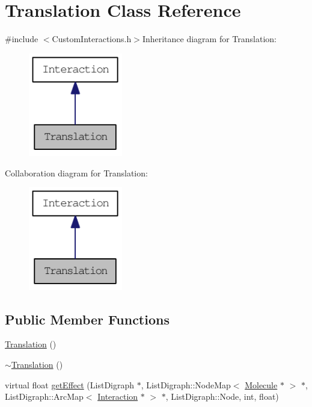 \hypertarget{classTranslation}{
\section{Translation Class Reference}
\label{classTranslation}
}


{\ttfamily \#include $<$CustomInteractions.h$>$}Inheritance diagram for Translation:\nopagebreak
\begin{figure}[H]
\begin{center}
\leavevmode
\includegraphics[width=116pt]{classTranslation__inherit__graph}
\end{center}
\end{figure}
Collaboration diagram for Translation:\nopagebreak
\begin{figure}[H]
\begin{center}
\leavevmode
\includegraphics[width=116pt]{classTranslation__coll__graph}
\end{center}
\end{figure}
\subsection*{Public Member Functions}
\begin{DoxyCompactItemize}
\item 
\hyperlink{classTranslation_a19a6742a807888b66b0a402469bbf588}{Translation} ()
\item 
\hyperlink{classTranslation_ab6843356b4ba3234408b6a6024f0a5f1}{$\sim$Translation} ()
\item 
virtual float \hyperlink{classTranslation_a6599a0f28a58b5adf122d8b8c6206061}{getEffect} (ListDigraph $\ast$, ListDigraph::NodeMap$<$ \hyperlink{classMolecule}{Molecule} $\ast$ $>$ $\ast$, ListDigraph::ArcMap$<$ \hyperlink{classInteraction}{Interaction} $\ast$ $>$ $\ast$, ListDigraph::Node, int, float)
\end{DoxyCompactItemize}


